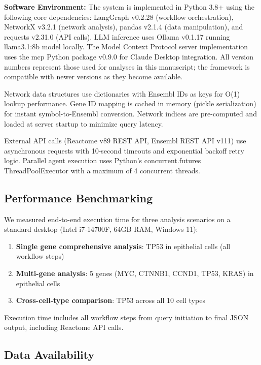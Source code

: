 \documentclass[11pt]{article}
\begin{document}
\textbf{Software Environment:} The system is implemented in Python 3.8+ using the following core dependencies: LangGraph v0.2.28 (workflow orchestration), NetworkX v3.2.1 (network analysis), pandas v2.1.4 (data manipulation), and requests v2.31.0 (API calls). LLM inference uses Ollama v0.1.17 running llama3.1:8b model locally. The Model Context Protocol server implementation uses the mcp Python package v0.9.0 for Claude Desktop integration. All version numbers represent those used for analyses in this manuscript; the framework is compatible with newer versions as they become available.

Network data structures use dictionaries with Ensembl IDs as keys for O(1) lookup performance. Gene ID mapping is cached in memory (pickle serialization) for instant symbol-to-Ensembl conversion. Network indices are pre-computed and loaded at server startup to minimize query latency.

External API calls (Reactome v89 REST API, Ensembl REST API v111) use asynchronous requests with 10-second timeouts and exponential backoff retry logic. Parallel agent execution uses Python's concurrent.futures ThreadPoolExecutor with a maximum of 4 concurrent threads.

\subsection{Performance Benchmarking}

We measured end-to-end execution time for three analysis scenarios on a standard desktop (Intel i7-14700F, 64GB RAM, Windows 11):

\begin{enumerate}
\item \textbf{Single gene comprehensive analysis}: TP53 in epithelial cells (all workflow steps)
\item \textbf{Multi-gene analysis}: 5 genes (MYC, CTNNB1, CCND1, TP53, KRAS) in epithelial cells
\item \textbf{Cross-cell-type comparison}: TP53 across all 10 cell types
\end{enumerate}

Execution time includes all workflow steps from query initiation to final JSON output, including Reactome API calls.

\subsection{Data Availability}
\end{document}
